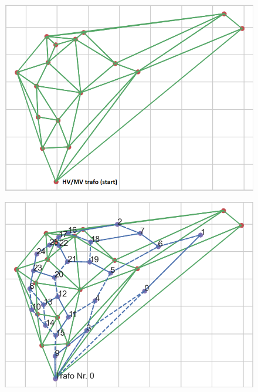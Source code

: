 \begin{figure}
	\centering
	\begin{minipage}{.5\textwidth}
		\centering
		\includegraphics[width=.9\linewidth]{figures/experiments/1000_iter/tri_1000.png}
		\label{fig:tri_1000}
	\end{minipage}%
	\begin{minipage}{.5\textwidth}
		\centering
		\includegraphics[width=.9\linewidth]{figures/experiments/1000_iter/tri_ant_1000.png}
		\label{fig:tri_ant_1000}
	\end{minipage}
\end{figure}

